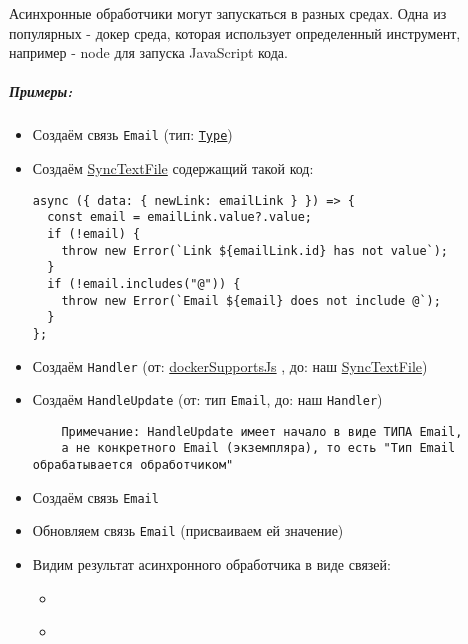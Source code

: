 \documentclass{article}
\begin{document}
Асинхронные обработчики могут запускаться в разных средах. Одна из популярных -
докер среда, которая использует определенный инструмент, например - node для
запуска JavaScript кода.
\subparagraph{Примеры:}

\begin{itemize}
  \item Создаём связь \texttt{Email} (тип: \texttt{\hyperlink{Core.Type.Description}{Type}})
  \item Создаём \hyperlink{Core.SyncTextFile.Description}{SyncTextFile} содержащий такой
        код:
        \begin{lstlisting}
async ({ data: { newLink: emailLink } }) => {
  const email = emailLink.value?.value;
  if (!email) {
    throw new Error(`Link ${emailLink.id} has not value`);
  }
  if (!email.includes("@")) {
    throw new Error(`Email ${email} does not include @`);
  }
};
\end{lstlisting}
  \item Создаём \texttt{Handler} (от:
        \hyperlink{Core.dockerSupportsJs.Description}{dockerSupportsJs} , до: наш
        \hyperlink{Core.SyncTextFile.Description}{SyncTextFile})
  \item Создаём \texttt{HandleUpdate} (от: тип \texttt{Email}, до: наш
        \texttt{Handler})
        \begin{verbatim}
    Примечание: HandleUpdate имеет начало в виде ТИПА Email,
    а не конкретного Email (экземпляра), то есть "Тип Email обрабатывается обработчиком"
    \end{verbatim}
  \item Создаём связь \texttt{Email}
  \item Обновляем связь \texttt{Email} (присваиваем ей значение)
  \item Видим результат асинхронного обработчика в виде связей:
        \begin{itemize}
          \item \begin{handler_success_result_info}
                \end{handler_success_result_info}\\

          \item \begin{handler_fail_result_info}
                \end{handler_fail_result_info}\\
        \end{itemize}
\end{itemize}
\end{document}
